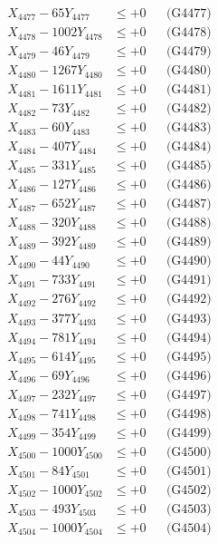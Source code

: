 \documentclass[a4paper,10pt]{article}
\begin{document}
{\begin{align}
X_{4477} - 65Y_{4477} &\leq +0 && \text{(G4477)} \\
X_{4478} - 1002Y_{4478} &\leq +0 && \text{(G4478)} \\
X_{4479} - 46Y_{4479} &\leq +0 && \text{(G4479)} \\
X_{4480} - 1267Y_{4480} &\leq +0 && \text{(G4480)} \\
\allowbreak
X_{4481} - 1611Y_{4481} &\leq +0 && \text{(G4481)} \\
X_{4482} - 73Y_{4482} &\leq +0 && \text{(G4482)} \\
X_{4483} - 60Y_{4483} &\leq +0 && \text{(G4483)} \\
X_{4484} - 407Y_{4484} &\leq +0 && \text{(G4484)} \\
X_{4485} - 331Y_{4485} &\leq +0 && \text{(G4485)} \\
X_{4486} - 127Y_{4486} &\leq +0 && \text{(G4486)} \\
X_{4487} - 652Y_{4487} &\leq +0 && \text{(G4487)} \\
X_{4488} - 320Y_{4488} &\leq +0 && \text{(G4488)} \\
X_{4489} - 392Y_{4489} &\leq +0 && \text{(G4489)} \\
X_{4490} - 44Y_{4490} &\leq +0 && \text{(G4490)} \\
\allowbreak
X_{4491} - 733Y_{4491} &\leq +0 && \text{(G4491)} \\
X_{4492} - 276Y_{4492} &\leq +0 && \text{(G4492)} \\
X_{4493} - 377Y_{4493} &\leq +0 && \text{(G4493)} \\
X_{4494} - 781Y_{4494} &\leq +0 && \text{(G4494)} \\
X_{4495} - 614Y_{4495} &\leq +0 && \text{(G4495)} \\
X_{4496} - 69Y_{4496} &\leq +0 && \text{(G4496)} \\
X_{4497} - 232Y_{4497} &\leq +0 && \text{(G4497)} \\
X_{4498} - 741Y_{4498} &\leq +0 && \text{(G4498)} \\
X_{4499} - 354Y_{4499} &\leq +0 && \text{(G4499)} \\
X_{4500} - 1000Y_{4500} &\leq +0 && \text{(G4500)} \\
\allowbreak
X_{4501} - 84Y_{4501} &\leq +0 && \text{(G4501)} \\
X_{4502} - 1000Y_{4502} &\leq +0 && \text{(G4502)} \\
X_{4503} - 493Y_{4503} &\leq +0 && \text{(G4503)} \\
X_{4504} - 1000Y_{4504} &\leq +0 && \text{(G4504)} \\

\end{align}}
\end{document}
